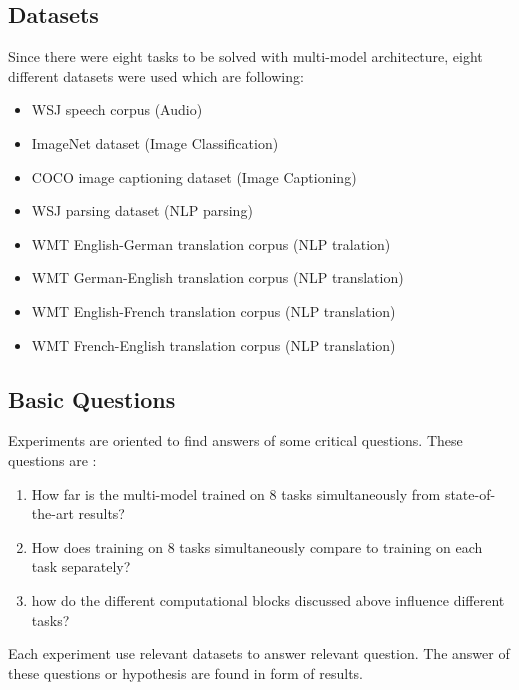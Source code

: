\documentclass[12pt]{article}
\begin{document}
\subsection{Datasets}
Since there were eight tasks to be solved with multi-model architecture, eight different datasets were used which are following:
\begin{itemize}
\item WSJ speech corpus (Audio)
\item ImageNet dataset (Image Classification)
\item COCO image captioning dataset (Image Captioning)
\item WSJ parsing dataset (NLP parsing)
\item WMT English-German translation corpus (NLP tralation)
\item WMT German-English translation corpus (NLP translation)
\item WMT English-French translation corpus (NLP translation)
\item WMT French-English translation corpus (NLP translation)
\end{itemize}
\subsection{Basic Questions}
Experiments are oriented to find answers of some critical questions. These questions are :
\begin{enumerate}
\item How far is the multi-model trained on $8$ tasks simultaneously from state-of-the-art results?
\item How does training on $8$ tasks simultaneously compare to training on each task separately?
\item how do the different computational blocks discussed above influence different tasks?
\end{enumerate}
Each experiment use relevant datasets to answer relevant question. The answer of these questions or hypothesis are found in form of
results.
\end{document}
